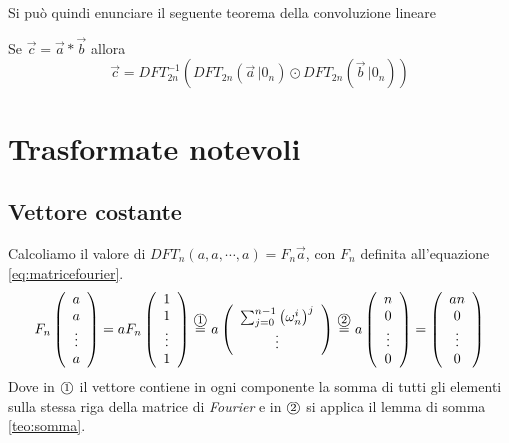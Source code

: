 Si può quindi enunciare il seguente teorema della convoluzione lineare

\begin{theorem}
    Se $\vec{c} = \vec{a} * \vec{b}$ allora
    \begin{equation*}
        \vec{c} = DFT_{2n}^{-1} \left( 
            DFT_{2n} \left( \vec{a} \, | 0_n \right)
            \odot
            DFT_{2n} \left( \vec{b} \, | 0_n \right)
        \right)
    \end{equation*}
    \label{teo:convlin}
\end{theorem}

\section{Trasformate notevoli}

\subsection{Vettore costante}
Calcoliamo il valore di $DFT_n \left( a, a, \cdots, a \right) = F_n \vec{a}$, con $F_n$ definita all'equazione \ref{eq:matricefourier}.
\begin{equation*}
    F_n
    \left( 
        \begin{array}[h]{c}
            a \\ a \\ \vdots \\ a
        \end{array}
    \right)
    =
    a F_n
    \left( 
        \begin{array}[h]{c}
            1 \\ 1 \\ \vdots \\ 1
        \end{array}
    \right)
    \overset{\circola{1}}{=}
    a
    \left( 
        \begin{array}[h]{c}
            \sum_{j=0}^{n-1} \left( \omega_n^i \right)^j  \\
            \vdots
        \end{array}
    \right)
    \overset{\circola{2}}{=}
    a
    \left( 
        \begin{array}[h]{c}
            n \\ 0 \\ \vdots \\ 0
        \end{array}
    \right)
    =
    \left( 
        \begin{array}[h]{c}
            an \\ 0 \\ \vdots \\ 0
        \end{array}
    \right)
\end{equation*}
Dove in $\mbox{\textcircled{\footnotesize 1}}$ il vettore contiene in ogni componente la somma di tutti gli elementi sulla stessa riga della matrice di \textit{Fourier} e in $\mbox{\textcircled{\footnotesize 2}}$ si applica il lemma di somma \ref{teo:somma}.

